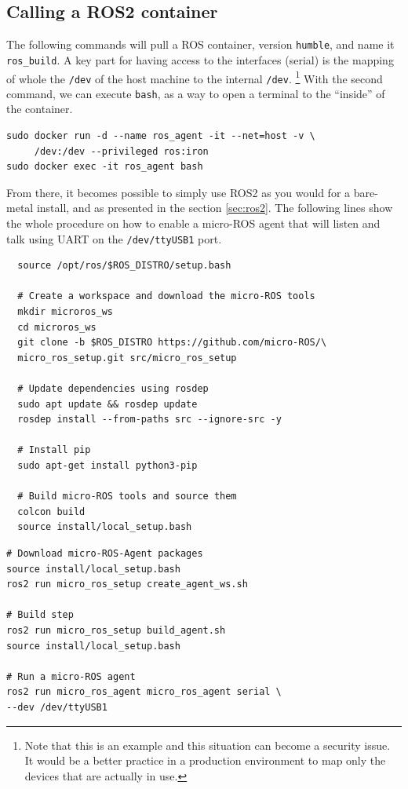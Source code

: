 \documentclass[10pt]{article}
\begin{document}
\subsection{Calling a ROS2 container}
\label{sec:call-ros2-cont}
The following commands will pull a ROS container, version \verb|humble|, and name it \verb|ros_build|.
A key part for having access to the interfaces (serial) is the mapping of whole the \verb|/dev| of  the host machine to the
internal \verb|/dev|. \footnote{Note that this is an example and this situation can become a security issue. It would be a better practice
in a production environment to map only the devices that are actually in use.}
With the second command, we can execute \verb|bash|, as a way to open a terminal to the ``inside'' of the container.
\begin{tcolorbox}
\begin{verbatim}
sudo docker run -d --name ros_agent -it --net=host -v \
     /dev:/dev --privileged ros:iron
sudo docker exec -it ros_agent bash
\end{verbatim}
\end{tcolorbox}

From there, it becomes possible to simply use ROS2 as you would for a bare-metal install, and as presented in the section \ref{sec:ros2}.
The following lines show the whole procedure on how to enable a micro-ROS agent that will listen and talk using UART on the \verb|/dev/ttyUSB1| port.
\begin{tcolorbox}
\begin{verbatim}
  source /opt/ros/$ROS_DISTRO/setup.bash

  # Create a workspace and download the micro-ROS tools
  mkdir microros_ws
  cd microros_ws
  git clone -b $ROS_DISTRO https://github.com/micro-ROS/\
  micro_ros_setup.git src/micro_ros_setup

  # Update dependencies using rosdep
  sudo apt update && rosdep update
  rosdep install --from-paths src --ignore-src -y

  # Install pip
  sudo apt-get install python3-pip

  # Build micro-ROS tools and source them
  colcon build
  source install/local_setup.bash
\end{verbatim}
\end{tcolorbox}

\begin{tcolorbox}
\begin{verbatim}
# Download micro-ROS-Agent packages
source install/local_setup.bash
ros2 run micro_ros_setup create_agent_ws.sh

# Build step
ros2 run micro_ros_setup build_agent.sh
source install/local_setup.bash

# Run a micro-ROS agent
ros2 run micro_ros_agent micro_ros_agent serial \
--dev /dev/ttyUSB1
\end{verbatim}
\end{tcolorbox}
\end{document}
